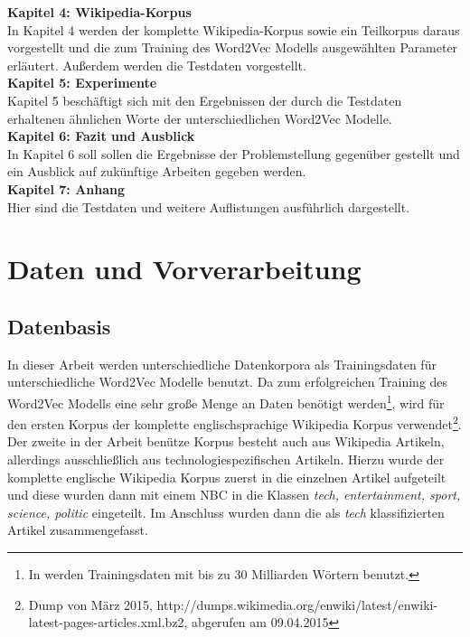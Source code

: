 \documentclass[12pt,a4paper]{report}
\begin{document}
	\textbf{Kapitel 4: Wikipedia-Korpus}\\
	In Kapitel 4 werden der komplette Wikipedia-Korpus sowie ein Teilkorpus daraus vorgestellt und die zum Training des Word2Vec Modells ausgewählten Parameter erläutert. Außerdem werden die Testdaten vorgestellt.\\
	
	\textbf{Kapitel 5: Experimente}\\
	Kapitel 5 beschäftigt sich mit den Ergebnissen der durch die Testdaten erhaltenen ähnlichen Worte der unterschiedlichen Word2Vec Modelle.\\
	
	\textbf{Kapitel 6: Fazit und Ausblick}\\
	In Kapitel 6 soll sollen die Ergebnisse der Problemstellung gegenüber gestellt und ein Ausblick auf zukünftige Arbeiten gegeben werden.\\
	
	\textbf{Kapitel 7: Anhang}\\
	Hier sind die Testdaten und weitere Auflistungen ausführlich dargestellt.\\

\newpage
\chapter{Daten und Vorverarbeitung}
	\section{Datenbasis}
	In dieser Arbeit werden unterschiedliche Datenkorpora als Trainingsdaten für unterschiedliche Word2Vec Modelle benutzt. Da zum erfolgreichen Training des Word2Vec Modells eine sehr große Menge an Daten benötigt werden\footnote{In \cite{DBLP:journals/corr/MikolovSCCD13} werden Trainingsdaten mit bis zu 30 Milliarden Wörtern benutzt.}, wird für den ersten Korpus der komplette englischsprachige Wikipedia Korpus verwendet\footnote{Dump von März 2015, http://dumps.wikimedia.org/enwiki/latest/enwiki-latest-pages-articles.xml.bz2, abgerufen am 09.04.2015}. Der zweite in der Arbeit benütze Korpus besteht auch aus Wikipedia Artikeln, allerdings ausschließlich aus technologiespezifischen Artikeln. Hierzu wurde der komplette englische Wikipedia Korpus zuerst in die einzelnen Artikel aufgeteilt und diese wurden dann mit einem NBC in die Klassen \textit{tech, entertainment, sport, science, politic} eingeteilt. Im Anschluss wurden dann die als \textit{tech} klassifizierten Artikel zusammengefasst.
	
\end{document}
